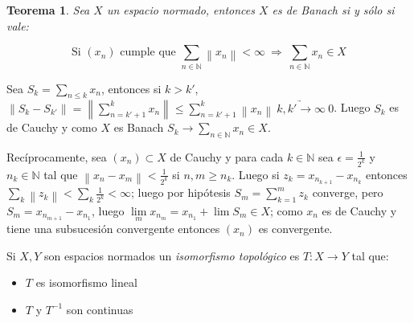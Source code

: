 \documentclass[11pt]{article}
\newcommand{\N}{{\mathbb{N}}}
\newcommand{\norm}[1]{\left\lVert#1\right\rVert}
\newcommand{\Bigsum}[2]{\sum\limits_{#1}{#2}}
\newtheorem{theorem}{Teorema}
\numberwithin{theorem}{subsection}
\newenvironment{proof}[1][Demostraci\'on]{\begin{trivlist}
		\item[\hskip \labelsep {\bfseries #1}]}{\end{trivlist}}
\newenvironment{definition}[1][Definici\'on]{\begin{trivlist}
		\item[\hskip \labelsep {\bfseries #1}]}{\end{trivlist}}
\newcommand{\qed}{\nobreak \ifvmode \relax \else
	\ifdim\lastskip<1.5em \hskip-\lastskip
	\hskip1.5em plus0em minus0.5em \fi \nobreak
	\vrule height0.75em width0.5em depth0.25em\fi}
\begin{document}
\begin{theorem}
	\label{Banach si y solo si abs convergente es convergente}
	Sea $X$ un espacio normado, entonces $X$ es de Banach si y s\'olo si vale:
	
	\begin{equation}
		\label{eq: Condicion de Banach}
		\text{Si } \left(x_n\right) \text{ cumple que } \Bigsum{n \in \N}{\norm{x_n}} < \infty \ \Longrightarrow \ \Bigsum{n \in \N}{x_n} \in X
	\end{equation}
	
\end{theorem}

\begin{proof}
	Sea $S_k = \Bigsum{n \leq k}{x_n}$, entonces si $k > k'$, $\norm{S_{k} - S_{k'}} = \norm{\sum\limits_{n = k'+1}^{k}{x_n}} \leq \sum\limits_{n = k'+1}^{k}{\norm{x_n}} \ \underrightarrow{k,k' \rightarrow \infty} \ 0$. Luego $S_k$ es de Cauchy y como $X$ es Banach $S_k \rightarrow \Bigsum{n \in \N}{x_n} \in X$.
	
	Rec\'iprocamente, sea $\left(x_n\right) \subset X$ de Cauchy y para cada $k \in \N$ sea $\epsilon = \frac{1}{2^k}$ y $n_k \in \N$ tal que $\norm{x_{n} - x_m} < \frac{1}{2^k}$ si $n,m \geq n_k$. Luego si $z_k = x_{n_{k+1}} - x_{n_k}$ entonces $\Bigsum{k}{\norm{z_k}} < \Bigsum{k}{\frac{1}{2^k}} < \infty$; luego por hip\'otesis $S_m = \sum\limits_{k=1}^{m}{z_k}$ converge, pero $S_m = x_{n_{m+1}} - x_{n_1}$, luego $\lim\limits_{m} {x_{n_m}} = x_{n_1} + \lim S_m \in X$; como $x_n$ es de Cauchy y tiene una subsucesi\'on convergente entonces $(x_n)$ es convergente. \qed
	
\end{proof}

\begin{definition}
	Si $X,Y$ son espacios normados un \textit{isomorfismo topol\'ogico} es $T : X \rightarrow Y$ tal que:
	
	\begin{itemize}
		\item $T$ es isomorfismo lineal
		\item $T$ y $T^{-1}$ son continuas
	\end{itemize}
	
\end{definition}
\end{document}
